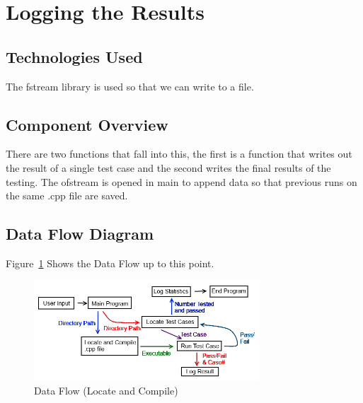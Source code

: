 \section{Logging the Results}

\subsection{Technologies Used}
The fstream library is used so that we can write to a file.

\subsection{Component Overview}
There are two functions that fall into this, the first is a function that writes out the result of a single test case and the second
writes the final results of the testing.  The ofstream is opened in main to append data so that previous runs on the same
.cpp file are saved.

\subsection{Data Flow Diagram}
Figure~\ref{DataFlow4} Shows the Data Flow up to this point.

\begin{figure}[tbh]
\begin{center}
\includegraphics[width=0.75\textwidth]{./DataFlow4}
\end{center}
\caption{Data Flow (Locate and Compile) \label{DataFlow4}}
\end{figure}


